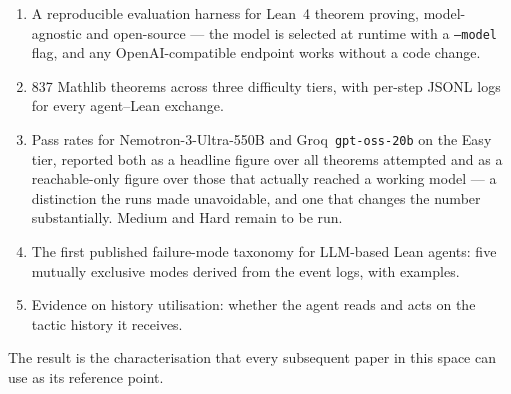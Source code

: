 \begin{enumerate}
  \item A reproducible evaluation harness for Lean~4 theorem proving,
        model-agnostic and open-source --- the model is selected at runtime with a
        \texttt{--model} flag, and any OpenAI-compatible endpoint works without a
        code change.
  \item 837 Mathlib theorems across three difficulty tiers, with per-step JSONL logs
        for every agent--Lean exchange.
  \item Pass rates for Nemotron-3-Ultra-550B and Groq~\texttt{gpt-oss-20b} on the Easy
        tier, reported both as a headline figure over all theorems attempted and as a
        reachable-only figure over those that actually reached a working model ---
        a distinction the runs made unavoidable, and one that changes the number
        substantially. Medium and Hard remain to be run.
  \item The first published failure-mode taxonomy for LLM-based Lean agents:
        five mutually exclusive modes derived from the event logs, with examples.
  \item Evidence on history utilisation: whether the agent reads and acts on
        the tactic history it receives.
\end{enumerate}

The result is the characterisation that every subsequent paper in this space can use
as its reference point.
